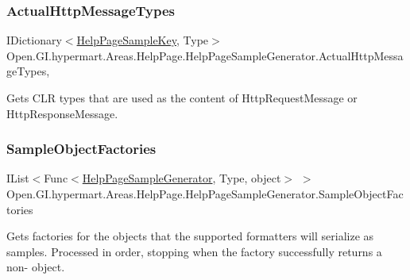 \subsubsection{\texorpdfstring{Actual\+Http\+Message\+Types}{ActualHttpMessageTypes}}
{\footnotesize\ttfamily I\+Dictionary$<$\hyperlink{class_open_1_1_g_i_1_1hypermart_1_1_areas_1_1_help_page_1_1_help_page_sample_key}{Help\+Page\+Sample\+Key}, Type$>$ Open.\+G\+I.\+hypermart.\+Areas.\+Help\+Page.\+Help\+Page\+Sample\+Generator.\+Actual\+Http\+Message\+Types\hspace{0.3cm}{\ttfamily [get]}, {\ttfamily [set]}}



Gets C\+LR types that are used as the content of Http\+Request\+Message or Http\+Response\+Message. 

\hypertarget{class_open_1_1_g_i_1_1hypermart_1_1_areas_1_1_help_page_1_1_help_page_sample_generator_a659aa13a69376385d931264d06fbd398}{}\label{class_open_1_1_g_i_1_1hypermart_1_1_areas_1_1_help_page_1_1_help_page_sample_generator_a659aa13a69376385d931264d06fbd398} 
\subsubsection{\texorpdfstring{Sample\+Object\+Factories}{SampleObjectFactories}}
{\footnotesize\ttfamily I\+List$<$Func$<$\hyperlink{class_open_1_1_g_i_1_1hypermart_1_1_areas_1_1_help_page_1_1_help_page_sample_generator}{Help\+Page\+Sample\+Generator}, Type, object$>$ $>$ Open.\+G\+I.\+hypermart.\+Areas.\+Help\+Page.\+Help\+Page\+Sample\+Generator.\+Sample\+Object\+Factories\hspace{0.3cm}{\ttfamily [get]}}



Gets factories for the objects that the supported formatters will serialize as samples. Processed in order, stopping when the factory successfully returns a non-\/ object. 

